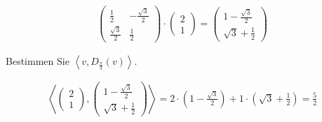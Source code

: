 \begin{align*}
    \begin{pmatrix}
        \frac{1}{2}        & -\frac{\sqrt{3}}{2} \\
        \frac{\sqrt{3}}{2} & \frac{1}{2}
    \end{pmatrix} \cdot \begin{pmatrix}
                            2 \\ 1
                        \end{pmatrix} = \begin{pmatrix}
                                            1 - \frac{\sqrt{3}}{2} \\
                                            \sqrt{3} + \frac{1}{2}
                                        \end{pmatrix}
\end{align*}

Bestimmen Sie $\left<v, D_{\frac{\pi}{3}}(v)\right>$.

\begin{align*}
    \left<\begin{pmatrix}
              2 \\ 1
          \end{pmatrix}, \begin{pmatrix}
                             1 - \frac{\sqrt{3}}{2} \\
                             \sqrt{3} + \frac{1}{2}
                         \end{pmatrix}\right> = 2 \cdot \left(1 - \frac{\sqrt{3}}{2}\right) + 1 \cdot \left(\sqrt{3} + \frac{1}{2}\right) = \frac{5}{2}
\end{align*}
